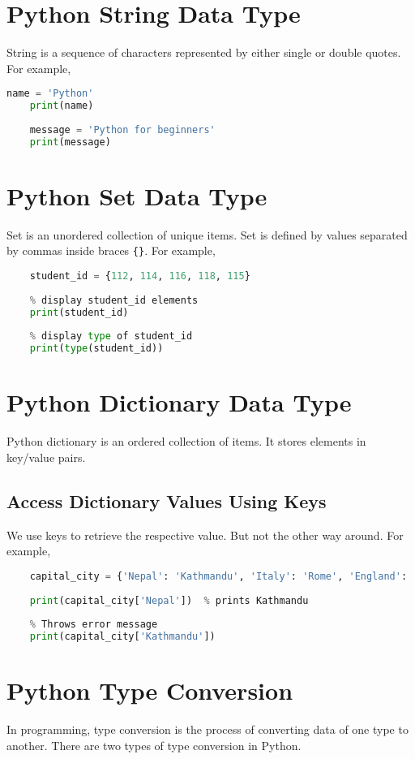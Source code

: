 \documentclass{article}
\begin{document}
\section{Python String Data Type}
String is a sequence of characters represented by either single or double quotes. For example,
\begin{lstlisting}[language=Python]
	name = 'Python'
	print(name)  
	
	message = 'Python for beginners'
	print(message)
\end{lstlisting}

\section{Python Set Data Type}
Set is an unordered collection of unique items. Set is defined by values separated by commas inside braces \texttt{\{\}}. For example,
\begin{lstlisting}[language=Python]
	% create a set named student_id
	student_id = {112, 114, 116, 118, 115}
	
	% display student_id elements
	print(student_id)
	
	% display type of student_id
	print(type(student_id))
\end{lstlisting}

\section{Python Dictionary Data Type}
Python dictionary is an ordered collection of items. It stores elements in key/value pairs.

\subsection{Access Dictionary Values Using Keys}
We use keys to retrieve the respective value. But not the other way around. For example,
\begin{lstlisting}[language=Python]
	% create a dictionary named capital_city
	capital_city = {'Nepal': 'Kathmandu', 'Italy': 'Rome', 'England': 'London'}
	
	print(capital_city['Nepal'])  % prints Kathmandu
	
	% Throws error message
	print(capital_city['Kathmandu'])
\end{lstlisting}

\section{Python Type Conversion}
In programming, type conversion is the process of converting data of one type to another. There are two types of type conversion in Python.
\end{document}
